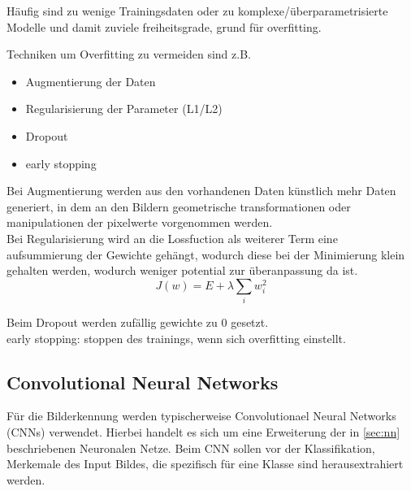 %     

Häufig sind zu wenige Trainingsdaten oder zu komplexe/überparametrisierte
 Modelle und damit zuviele freiheitsgrade, grund für overfitting.



Techniken um Overfitting zu vermeiden sind z.B.
\begin{itemize}
    \item Augmentierung der Daten
    \item Regularisierung der Parameter (L1/L2)
    \item Dropout
    \item early stopping
\end{itemize}

Bei Augmentierung werden aus den vorhandenen Daten künstlich mehr 
Daten generiert, in dem an den Bildern geometrische transformationen 
oder manipulationen der pixelwerte vorgenommen werden.
\\
Bei Regularisierung wird an die Lossfuction als weiterer Term
 eine aufsummierung der Gewichte gehängt, wodurch diese bei der Minimierung 
  klein gehalten werden, wodurch weniger potential zur überanpassung da ist.
  \begin{equation}
    \label{eq:regularization}
    J(w) = E + \lambda \sum_{i} w_{i}^{2}
\end{equation}

Beim Dropout werden zufällig gewichte zu 0 gesetzt.
\\
early stopping: stoppen des trainings, wenn sich overfitting einstellt.




\subsection{Convolutional Neural Networks}\label{sec:cnn}

Für die Bilderkennung werden typischerweise Convolutionael 
Neural Networks (CNNs) verwendet. Hierbei handelt es sich um eine Erweiterung
der in \ref{sec:nn} beschriebenen Neuronalen Netze. Beim CNN 
sollen vor der Klassifikation, Merkemale des Input Bildes,
die spezifisch für eine Klasse sind herausextrahiert werden.

